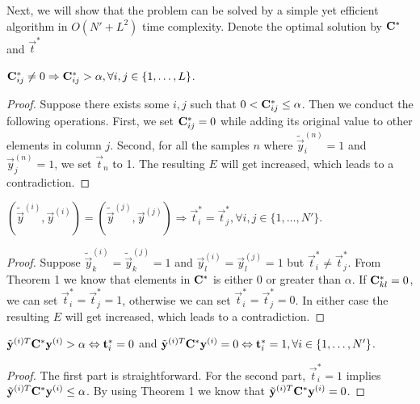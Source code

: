 Next, we will show that the problem can be solved by a simple yet efficient algorithm in $O(N'+L^2)$ time complexity. Denote the optimal solution by $\mathbf{C}^*$ and $\vec{t}^*$
\begin{theorem}
$\mathbf{C}^*_{ij} \neq 0 \Rightarrow \mathbf{C}^*_{ij} > \alpha, \forall i,j \in \{1,\dots,L\}$.
\end{theorem}
\begin{proof}
Suppose there exists some $i,j$ such that $0 < \mathbf{C}^*_{ij} \leq \alpha$. Then we conduct the following operations. First, we set $\mathbf{C}^*_{ij}=0$ while adding its original value to other elements in column $j$. Second, for all the samples $n$ where $\tilde{\vec{y}}^{(n)}_i=1$ and $\vec{y}^{(n)}_j=1$, we set $\vec{t}_n$ to 1. The resulting $E$ will get increased, which leads to a contradiction.
\end{proof}
\begin{theorem}
$(\tilde{\vec{y}}^{(i)},\vec{y}^{(i)})=(\tilde{\vec{y}}^{(j)},\vec{y}^{(j)}) \Rightarrow \vec{t}^*_i=\vec{t}^*_j, \forall i,j \in \{1,\dots,N'\}$.
\end{theorem}
\begin{proof}
Suppose $\tilde{\vec{y}}^{(i)}_k=\tilde{\vec{y}}^{(j)}_k=1$ and $\vec{y}^{(i)}_l=\vec{y}^{(j)}_l=1$ but $\vec{t}^*_i \neq \vec{t}^*_j$. From Theorem 1 we know that elements in $\mathbf{C}^*$ is either 0 or greater than $\alpha$. If $\mathbf{C}^*_{kl}=0$, we can set $\vec{t}^*_i=\vec{t}^*_j=1$, otherwise we can set $\vec{t}^*_i=\vec{t}^*_j=0$. In either case the resulting $E$ will get increased, which leads to a contradiction.
\end{proof}
\begin{theorem}
$\tilde{\mathbf{y}}^{(i)T} \mathbf{C}^* \mathbf{y}^{(i)} > \alpha \Leftrightarrow \mathbf{t}^*_i=0$ and $\tilde{\mathbf{y}}^{(i)T} \mathbf{C}^* \mathbf{y}^{(i)} = 0 \Leftrightarrow \mathbf{t}^*_i=1, \forall i \in \{1,\dots,N'\}$.
\end{theorem}
\begin{proof}
The first part is straightforward. For the second part, $\vec{t}^*_i=1$ implies $\tilde{\mathbf{y}}^{(i)T} \mathbf{C}^* \mathbf{y}^{(i)} \leq \alpha$. By using Theorem 1 we know that $\tilde{\mathbf{y}}^{(i)T} \mathbf{C}^* \mathbf{y}^{(i)} = 0$.
\end{proof}

